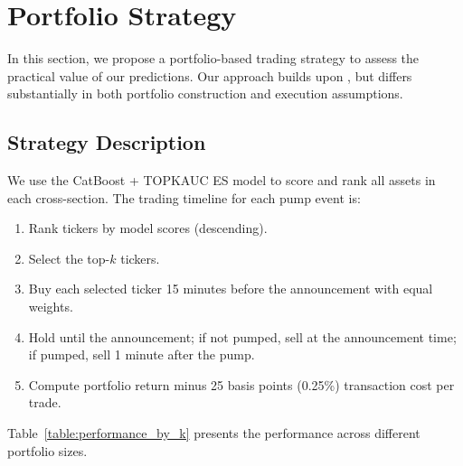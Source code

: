 \documentclass{ieeeaccess}
\begin{document}
\section{Portfolio Strategy}

In this section, we propose a portfolio-based trading strategy to assess the practical value of our predictions. Our approach builds upon \cite{pd_anatomy}, but differs substantially in both portfolio construction and execution assumptions.

\subsection{Strategy Description}

We use the CatBoost + TOPKAUC ES model to score and rank all assets in each cross-section. The trading timeline for each pump event is:
\begin{enumerate}
  \item Rank tickers by model scores (descending).
  \item Select the top-$k$ tickers.
  \item Buy each selected ticker 15 minutes before the announcement with equal weights.
  \item Hold until the announcement; if not pumped, sell at the announcement time; if pumped, sell 1 minute after the pump.
  \item Compute portfolio return minus 25 basis points (0.25\%) transaction cost per trade.
\end{enumerate}

Table~\ref{table:performance_by_k} presents the performance across different portfolio sizes.
\end{document}

